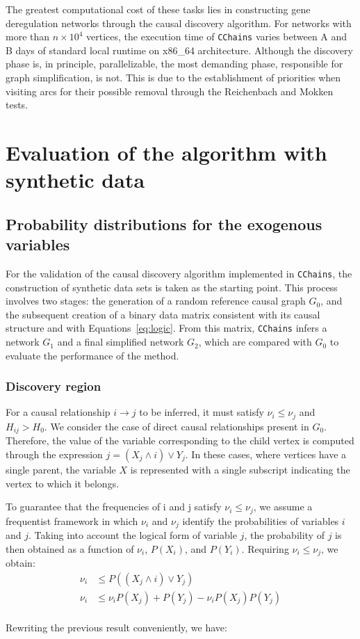 \documentclass[12pt,a4paper]{report}
\begin{document}
The greatest computational cost of these tasks lies in constructing gene deregulation networks through the causal discovery algorithm. For networks with more than $n \times 10^4$ vertices, the execution time of \texttt{CChains} varies between A and B days of standard local runtime on x86\_64 architecture. Although the discovery phase is, in principle, parallelizable, the most demanding phase, responsible for graph simplification, is not. This is due to the establishment of priorities when visiting arcs for their possible removal through the Reichenbach and Mokken tests.


\section{Evaluation of the algorithm with synthetic data}


\subsection{Probability distributions for the exogenous variables}
\label{sec:generacion}

For the validation of the causal discovery algorithm implemented in \texttt{CChains}, the construction of synthetic data sets is taken as the starting point. This process involves two stages: the generation of a random reference causal graph \( G_0 \), and the subsequent creation of a binary data matrix consistent with its causal structure and with Equations~\ref{eq:logic}. From this matrix, \texttt{CChains} infers a network \( G_1 \) and a final simplified network \( G_2 \), which are compared with \( G_0 \) to evaluate the performance of the method.

\subsubsection*{Discovery region}

For a causal relationship \( i \to j \) to be inferred, it must satisfy \( \nu_i \leq \nu_j \) and \(H_{ij} > H_0 \). We consider the case of direct causal relationships present in $G_0$. Therefore, the value of the variable corresponding to the child vertex is computed through the expression \( j = (X_j \land i) \lor Y_j \). In these cases, where vertices have a single parent, the variable $X$ is represented with a single subscript indicating the vertex to which it belongs.

To guarantee that the frequencies of i and j satisfy \( \nu_i \leq \nu_j \), we assume a frequentist framework in which $\nu_i$ and $\nu_j$ identify the probabilities of variables $i$ and $j$. Taking into account the logical form of variable $j$, the probability of $j$ is then obtained as a function of $\nu_i$, $P(X_i)$, and $P(Y_i)$. Requiring $\nu_i \leq \nu_j$, we obtain:
\begin{align*}
\nu_i &\leq P((X_j \land i) \lor Y_j) \\
\nu_i &\leq \nu_i P(X_j) + P(Y_j) - \nu_i P(X_j)P(Y_j)
\end{align*}
\\
Rewriting the previous result conveniently, we have:
\end{document}
